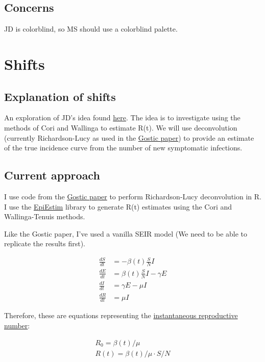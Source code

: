 \documentclass{article}
\begin{document}
\subsection{Concerns}
JD is colorblind, so MS should use a colorblind palette.


\section{Shifts}
\subsection{Explanation of shifts}
An exploration of JD's idea found  \href{http://dushoff.github.io/notebook/shifts.html}{here}. The idea is to investigate using the methods of Cori and Wallinga to estimate R(t). We will use deconvolution (currently Richardson-Lucy as used in the \href{https://www.medrxiv.org/content/10.1101/2020.06.18.20134858v3}{Gostic paper}) to provide an estimate of the true incidence curve from the number of new symptomatic infections. 

\subsection{Current approach}
I use code from the \href{https://github.com/cobeylab/Rt_estimation}{Gostic paper} to perform Richardson-Lucy deconvolution in R. I use the \href{https://cran.r-project.org/web/packages/EpiEstim/index.html}{EpiEstim} library to generate R(t) estimates using the Cori and Wallinga-Tenuis methods. 

Like the Gostic paper, I've used a vanilla SEIR model (We need to be able to replicate the results first).

\begin{align}
\frac{dS}{dt} &= -\beta(t) \frac{S}{N}  I \\ 
\frac{dE}{dt} &= \beta(t) \frac{S}{N} I - \gamma E \\
\frac{dI}{dt} &= \gamma E - \mu I \\ 
\frac{dR}{dt} &= \mu I  
\end{align}

Therefore, these are equations representing the \href{https://www.ncbi.nlm.nih.gov/pmc/articles/PMC3935673/}{instantaneous reproductive number}:

\begin{align}
    R_0 = \beta(t)/\mu \\
    R(t) = \beta(t)/\mu \cdot S/N
\end{align}
\end{document}
